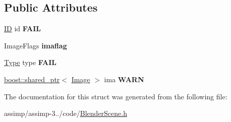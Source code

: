\subsection*{Public Attributes}
\begin{DoxyCompactItemize}
\item 
\hypertarget{struct_assimp_1_1_blender_1_1_tex_ad2af30771fd3bf16935ae1116d2d499d}{\hyperlink{struct_assimp_1_1_blender_1_1_i_d}{I\+D} id {\bfseries F\+A\+I\+L}}\label{struct_assimp_1_1_blender_1_1_tex_ad2af30771fd3bf16935ae1116d2d499d}

\item 
\hypertarget{struct_assimp_1_1_blender_1_1_tex_a7625b276ffe443b43f5d45c7b0cb2696}{Image\+Flags {\bfseries imaflag}}\label{struct_assimp_1_1_blender_1_1_tex_a7625b276ffe443b43f5d45c7b0cb2696}

\item 
\hypertarget{struct_assimp_1_1_blender_1_1_tex_a828dbe370c765d2466132a23afee02a2}{\hyperlink{struct_type}{Type} type {\bfseries F\+A\+I\+L}}\label{struct_assimp_1_1_blender_1_1_tex_a828dbe370c765d2466132a23afee02a2}

\item 
\hypertarget{struct_assimp_1_1_blender_1_1_tex_a2d084701108d945bdbef3e5800c55fcb}{\hyperlink{classboost_1_1shared__ptr}{boost\+::shared\+\_\+ptr}$<$ \hyperlink{struct_assimp_1_1_blender_1_1_image}{Image} $>$ ima {\bfseries W\+A\+R\+N}}\label{struct_assimp_1_1_blender_1_1_tex_a2d084701108d945bdbef3e5800c55fcb}

\end{DoxyCompactItemize}


The documentation for this struct was generated from the following file\+:\begin{DoxyCompactItemize}
\item 
assimp/assimp-\/3../code/\hyperlink{_blender_scene_8h}{Blender\+Scene.\+h}\end{DoxyCompactItemize}
